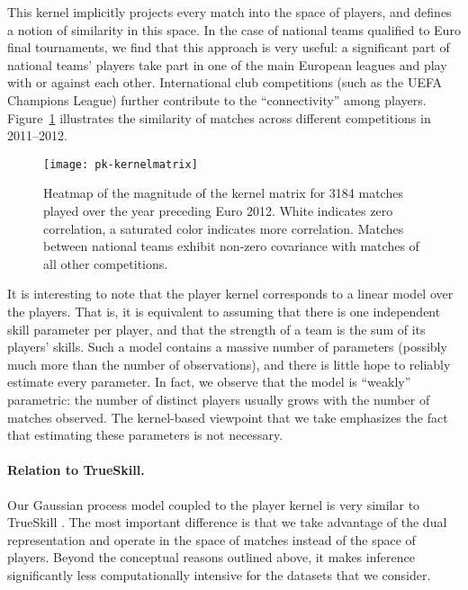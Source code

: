 This kernel implicitly projects every match into the space of players, and defines a notion of similarity in this space.
In the case of national teams qualified to Euro final tournaments, we find that this approach is very useful: a significant part of national teams' players take part in one of the main European leagues and play with or against each other.
International club competitions (such as the UEFA Champions League) further contribute to the ``connectivity'' among players.
Figure~\ref{pk:fig:kernel} illustrates the similarity of matches across different competitions in 2011--2012.


\begin{figure}[t]
  \centering
  \texttt{[image: pk-kernelmatrix]}
  \caption{Heatmap of the magnitude of the kernel matrix for \num{3184} matches played over the year preceding Euro 2012.
White indicates zero correlation, a saturated color indicates more correlation.
Matches between national teams exhibit non-zero covariance with matches of all other competitions.
}
  \label{pk:fig:kernel}
  \vspace{-0.1cm}
\end{figure}

It is interesting to note that the player kernel corresponds to a linear model over the players.
That is, it is equivalent to assuming that there is one independent skill parameter per player, and that the strength of a team is the sum of its players' skills.
Such a model contains a massive number of parameters (possibly much more than the number of observations), and there is little hope to reliably estimate every parameter.
In fact, we observe that the model is ``weakly'' parametric: the number of distinct players usually grows with the number of matches observed.
The kernel-based viewpoint that we take emphasizes the fact that estimating these parameters is not necessary.

\paragraph{Relation to TrueSkill.}
Our Gaussian process model coupled to the player kernel is very similar to TrueSkill \cite{herbrich2006trueskill}.
The most important difference is that we take advantage of the dual representation and operate in the space of matches instead of the space of players.
Beyond the conceptual reasons outlined above, it makes inference significantly less computationally intensive for the datasets that we consider.
